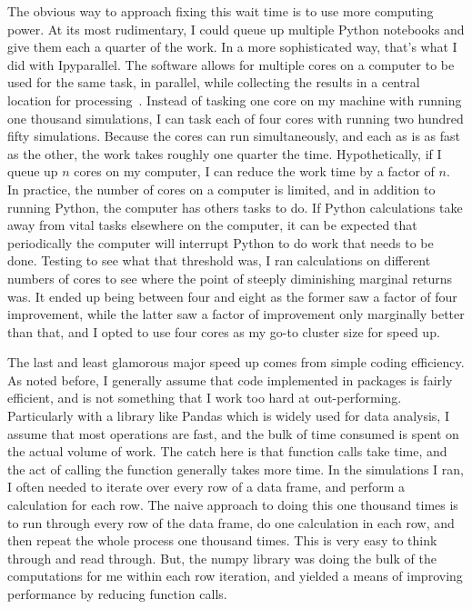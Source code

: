 \par The obvious way to approach fixing this wait time is to use more computing power.  At its most rudimentary, I could queue up multiple Python notebooks and give them each a quarter of the work.  In a more sophisticated way, that’s what I did with Ipyparallel.  The software allows for multiple cores on a computer to be used for the same task, in parallel, while collecting the results in a central location for processing~\citep{WEBSITE:8}.  Instead of tasking one core on my machine with running one thousand simulations, I can task each of four cores with running two hundred fifty simulations.  Because the cores can run simultaneously, and each as is as fast as the other, the work takes roughly one quarter the time.  Hypothetically, if I queue up $n$ cores on my computer, I can reduce the work time by a factor of $n$.  In practice, the number of cores on a computer is limited, and in addition to running Python, the computer has others tasks to do.  If Python calculations take away from vital tasks elsewhere on the computer, it can be expected that periodically the computer will interrupt Python to do work that needs to be done.  Testing to see what that threshold was, I ran calculations on different numbers of cores to see where the point of steeply diminishing marginal returns was.  It ended up being between four and eight as the former saw a factor of four improvement, while the latter saw a factor of improvement only marginally better than that, and I opted to use four cores as my go-to cluster size for speed up.

\par The last and least glamorous major speed up comes from simple coding efficiency.  As noted before, I generally assume that code implemented in packages is fairly efficient, and is not something that I work too hard at out-performing.  Particularly with a library like Pandas which is widely used for data analysis, I assume that most operations are fast, and the bulk of time consumed is spent on the actual volume of work.  The catch here is that function calls take time, and the act of calling the function generally takes more time.  In the simulations I ran, I often needed to iterate over every row of a data frame, and perform a calculation for each row.  The naive approach to doing this one thousand times is to run through every row of the data frame, do one calculation in each row, and then repeat the whole process one thousand times.  This is very easy to think through and read through.  But, the numpy library was doing the bulk of the computations for me within each row iteration, and yielded a means of improving performance by reducing function calls.

